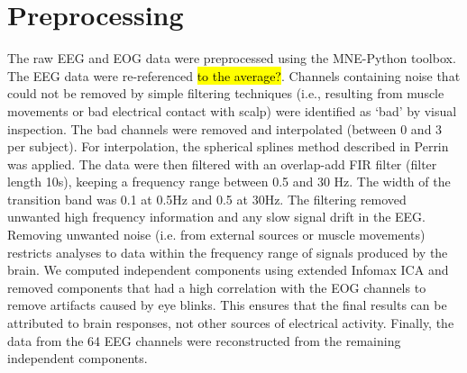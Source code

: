 \section{Preprocessing}
The raw EEG and EOG data were preprocessed using the MNE-Python toolbox. 
The EEG data were re-referenced \hl{to the average?}.
Channels containing noise that could not be removed by simple filtering techniques (i.e., resulting from muscle movements or bad electrical contact with scalp) were identified as `bad' by visual inspection.
The bad channels were removed and interpolated (between 0 and 3 per subject).
For interpolation, the spherical splines method described in Perrin \etal \citeyear{perrin_spherical_1989} was applied.
The data were then filtered with an overlap-add FIR filter (filter length 10s), keeping a frequency range between 0.5 and 30 Hz.
The width of the transition band was 0.1 at 0.5Hz and 0.5 at 30Hz.
The filtering removed unwanted high frequency information and any slow signal drift in the EEG.
Removing unwanted noise (i.e. from external sources or muscle movements) restricts analyses to data within the frequency range of signals produced by the brain. 
We computed independent components using extended Infomax \ac{ICA} \cite{lee_independent_1999} and removed components that had a high correlation with the EOG channels to remove artifacts caused by eye blinks.
This ensures that the final results can be attributed to brain responses, not other sources of electrical activity.
Finally, the data from the 64 EEG channels were reconstructed from the remaining independent components.